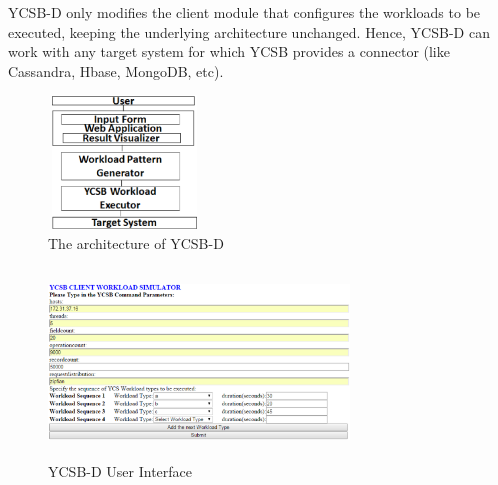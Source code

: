 \documentclass[conference]{IEEEtran}
\begin{document}
             YCSB-D only modifies the client module that configures the workloads to be executed, keeping the underlying
             architecture unchanged. Hence, YCSB-D  can work with any target system for which YCSB provides a connector
             (like Cassandra, Hbase, MongoDB, etc).
            \begin{figure}[!htbp]
        \centering
        \includegraphics[width=1.6in,height=1.4in]
                    {arch.eps}
        \caption{The architecture of YCSB-D}
        \label{fig:Arch}
\end{figure}


\begin{figure}[!htpb]%
       \centering%
        \includegraphics[width=8cm,height=5cm]
{ClientInput.eps}
                \caption{YCSB-D User Interface}%
\label{fig:input}%
        \end{figure}%
\end{document}
